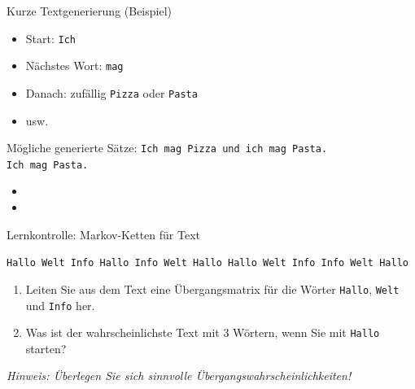 \begin{frame}[fragile]{Kurze Textgenerierung (Beispiel)}
    \begin{itemize}[<+->]
        \item Start: \texttt{Ich}
        \item Nächstes Wort: \texttt{mag}
        \item Danach: zufällig \texttt{Pizza} oder \texttt{Pasta}
        \item usw.
    \end{itemize}
    \vspace{0.3cm}
    \begin{block}{Mögliche generierte Sätze:}
        \texttt{Ich mag Pizza und ich mag Pasta.}\\
        \texttt{Ich mag Pasta.}
    \end{block}
    \vspace{0.3cm}
\end{frame}

\begin{frame}
    \begin{itemize}
        \item {}
        \item {}
    \end{itemize}
\end{frame}
\begin{frame}{Lernkontrolle: Markov-Ketten für Text}
    \begin{myexercise}

        {\footnotesize\texttt{Hallo Welt Info Hallo Info Welt Hallo Hallo Welt Info Info Welt Hallo}}

        \begin{enumerate}
            \item Leiten Sie aus dem Text eine Übergangsmatrix für die Wörter \texttt{Hallo}, \texttt{Welt} und \texttt{Info} her.
            \item Was ist der wahrscheinlichste Text mit 3 Wörtern, wenn Sie mit \texttt{Hallo} starten?
        \end{enumerate}
        \textit{Hinweis: Überlegen Sie sich sinnvolle Übergangswahrscheinlichkeiten!}

    \end{myexercise}
\end{frame}

